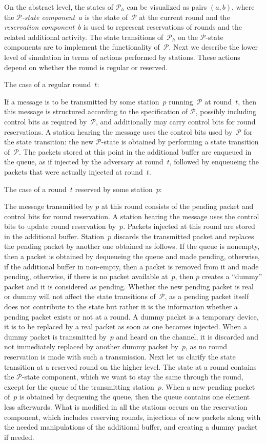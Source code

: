 \documentclass[11pt]{article}
\newcommand{\cP}{\mathcal{P}}
\begin{document}
On the abstract level, the states of $\cP_h$ can be visualized as pairs $(a,b)$, where the \emph{$\cP$-state component~$a$} is the state of~$\cP$ at the current round and the \emph{reservation component~$b$}  is used to represent reservations of rounds and the related additional activity.
The state transitions of~$\cP_h$ on the $\cP$-state components are to implement the functionality of~$\cP$.
Next we describe the lower level of simulation in terms of actions performed by stations.
These actions depend on whether the round is regular or reserved.

\noindent
The case of a regular round~$t$:

If a message is to be transmitted by some station~$p$ running~$\cP$ at round~$t$, then this message is structured according to the specification of $\cP$, possibly including control bits as required by~$\cP$, and additionally may carry control bits for round reservations.
A station hearing the message uses the control bits used by~$\cP$ for the state transition: the new $\cP$-state is obtained by performing a state transition of~$\cP$.
The packets stored at this point in the additional buffer are enqueued in the queue, as if injected by the adversary at round~$t$, followed by enqueueing the packets that were actually injected at round~$t$.

\noindent
The case of a round~$t$ reserved by some station~$p$:

The message transmitted by $p$ at this round consists of the pending packet and control bits for round reservation.
A station hearing the message uses the control bits to update round reservation by~$p$.
Packets injected at this round are stored in the additional buffer.
Station~$p$ discards the transmitted packet and replaces the pending packet by another one obtained as follows.
If the queue is nonempty, then a packet is obtained by dequeueing the queue and made pending, otherwise, if the additional buffer in non-empty, then a packet is removed from it and made pending, otherwise, if there is no packet available at~$p$, then $p$ creates a ``dummy'' packet and it is considered as pending.
Whether the new  pending packet is real or dummy will not affect the state transitions of~$\cP$, as a pending packet itself does not contribute to the state but rather it is the information whether a pending packet exists or not at a round.
A dummy packet is a temporary device, it is to be replaced by a real packet as soon as one becomes injected.
When a dummy packet is transmitted by~$p$ and heard on the channel, it is discarded and not immediately replaced by another dummy packet by~$p$, as no round reservation is made with such a transmission.
Next let us clarify the state transition at a reserved round on the higher level.
The state at a round contains the $\cP$-state component, which we want to stay the same  through the round, except for the queue of the transmitting station~$p$. 
When a new pending packet of~$p$ is obtained by dequeuing the queue, then the queue   contains one element less afterwards.
What is modified in all the stations occurs on the reservation component, which includes reserving rounds, injections of new packets along with the needed manipulations of the additional buffer, and creating a dummy packet if needed.
\end{document}
